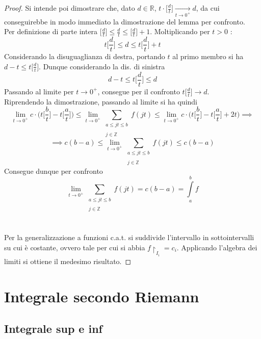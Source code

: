 \documentclass[10pt, oneside]{book}
\theoremstyle{plain}
\begin{document}
\begin{proof}
    Si intende poi dimostrare che, dato $d \in \mathbb{R}$, $t \cdot \big[ \frac{d}{t}\big] \xrightarrow[t \rightarrow 0^+]{} d$, da cui conseguirebbe in modo immediato la dimostrazione del lemma per confronto.
    \\Per definizione di parte intera $\big[\frac{d}{t}\big] \leq \frac{d}{t} \leq \big[\frac{d}{t}\big] + 1$. Moltiplicando per $t > 0$ :
    \[t \big[\frac{d}{t}\big] \leq d \leq t \big[\frac{d}{t}\big] + t\]
    Considerando la disuguaglianza di destra, portando $t$ al primo membro si ha $d - t \leq t \big[\frac{d}{t}\big]$. Dunque considerando la dis. di sinistra
    \[d - t \leq t \big[\frac{d}{t}\big] \leq d\]
    Passando al limite per $t \rightarrow 0^+$, consegue per il confronto $t \big[\frac{d}{t}\big] \rightarrow d$. 
    \\Riprendendo la dimostrazione, passando al limite si ha quindi 
    \[\lim \limits_{t \rightarrow 0^+} c \cdot \bigg(t \big[\frac{b}{t}\big] - t \big[\frac{a}{t}\big]\bigg) \leq \lim \limits_{t \rightarrow 0^+} \sum_{\substack{a \leq jt \leq b \\~\\ j \in \mathbb{Z}}} f(jt) \leq \lim \limits_{t \rightarrow 0^+} c \cdot \bigg(t \big[\frac{b}{t}\big] - t \big[\frac{a}{t}\big] + 2t \bigg) \implies\]
    \[\implies c(b - a) \leq \lim \limits_{t \rightarrow 0^+} \sum_{\substack{a \leq jt \leq b \\~\\ j \in \mathbb{Z}}} f(jt) \leq c(b - a)\]
    Consegue dunque per confronto
    \[\lim \limits_{t \rightarrow 0^+} \sum_{\substack{a \leq jt \leq b \\~\\ j \in \mathbb{Z}}} f(jt) = c (b - a) = \int\limits_{a}^{b} f\]
    \\~\\Per la generalizzazione a funzioni c.a.t. si suddivide l'intervallo in sottointervalli su cui è costante, ovvero tale per cui si abbia $f \restriction_{I_i} = c_i$. Applicando l'algebra dei limiti si ottiene il medesimo risultato.
\end{proof}

\section{Integrale secondo Riemann}

\subsection{Integrale sup e inf}
\end{document}
